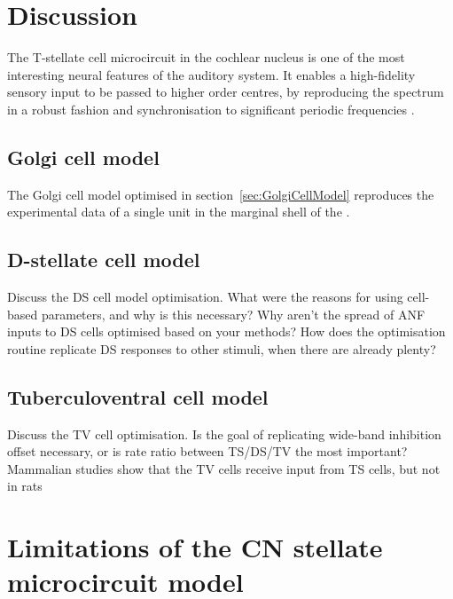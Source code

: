 \section{Discussion}

The T-stellate cell microcircuit in the
cochlear nucleus is one of the most interesting neural features of the
auditory system.  It enables a high-fidelity sensory input to be
passed to higher order centres, by reproducing the spectrum in a
robust fashion \citep{BlackburnSachs:1990,May:2003} and
synchronisation to significant periodic frequencies
\citep{KeilsonRichardsEtAl:1997}.

\medskip{} 

\subsection{Golgi cell model}
 The Golgi cell model optimised in section~\ref{sec:GolgiCellModel} reproduces the experimental data of a single
unit in the marginal shell of the \VCN \citep{GhoshalKim:1997}.

\medskip{}
\subsection{D-stellate cell model}
Discuss the DS cell model optimisation.  What were the reasons for
using cell-based parameters, and why is this necessary?  Why aren't
the spread of ANF inputs to DS cells optimised based on your methods?
How does the optimisation routine replicate DS responses to other
stimuli, when there are already plenty?

\medskip{}
\subsection{Tuberculoventral cell model}
Discuss the TV cell optimisation. Is the goal of replicating wide-band
inhibition offset necessary, or is rate ratio between TS/DS/TV the
most important?  Mammalian studies show that the TV cells receive
input from TS cells, but not in rats


\section{Limitations of the CN stellate microcircuit model}

